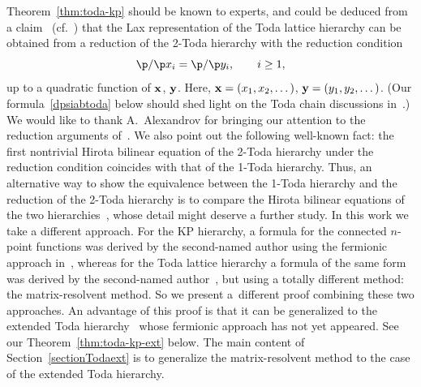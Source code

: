 \begin{Remark}\label{remark12}
Theorem~\ref{thm:toda-kp} should be known to experts, and could be deduced
from a claim~\cite[p.~30]{UT} (cf.\ \cite{KMMM}) that the Lax representation of the
Toda lattice hierarchy can be obtained from
a reduction of the 2-Toda hierarchy with
the reduction condition
\[
\p/\p x_i = \p /\p y_i, \qquad i\ge1,
\]
up to a quadratic function
of ${\bf x}$, ${\bf y}$. Here, ${\bf x}=(x_1,x_2,\dots)$, ${\bf y}=(y_1,y_2,\dots)$.
(Our formula~\eqref{dpsiabtoda} below should shed light on the Toda chain discussions in~\cite{KMMM}.)
We would like to thank A.~Alexandrov for bringing our attention to the reduction arguments of~\cite{UT}.
We also point out the following well-known fact: the first nontrivial Hirota bilinear equation
of the 2-Toda hierarchy under the reduction condition coincides with that of the 1-Toda hierarchy. Thus, an alternative way to
show the equivalence between the 1-Toda hierarchy and the reduction of the 2-Toda hierarchy is
to compare the Hirota bilinear equations of the two hierarchies~\cite{Milanov, UT}, whose detail might deserve
a further study.
In this work we take a different approach. For the KP hierarchy,
a formula for the connected $n$-point functions was derived by the second-named author using the fermionic approach in~\cite{Zhou-Emergent},
whereas for the Toda lattice hierarchy a formula of the same form was derived by the second-named author~\cite{Y}, but using a totally different method:
the matrix-resolvent method. So we present a~different proof combining these two approaches. An advantage of this proof is that it can be generalized
to the extended Toda hierarchy~\cite{CDZ} whose fermionic approach has not yet appeared. See our Theorem~\ref{thm:toda-kp-ext} below. The main content of Section~\ref{sectionTodaext}
is to generalize the matrix-resolvent method to the case of the extended Toda hierarchy.
\end{Remark}
